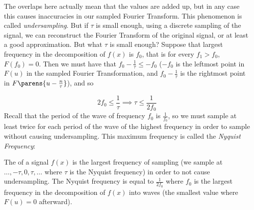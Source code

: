 \documentclass[10pt]{article}
\begin{document}
{\centering{}\par}

The overlaps here actually mean that the values are added up, but in any case this causes inaccuracies in our sampled Fourier Transform.
This phenomenon is called \emph{undersampling}.
But if $\tau$ is small enough, using a discrete sampling of the signal, we can reconstruct the Fourier Transform of the original signal, or at least a good approximation.
But what $\tau$ is small enough?
Suppose that largest frequency in the decomposition of $f(x)$ is $f_0$, that is for every $f_1>f_0$, $F(f_0)=0$.
Then we must have that $f_0-\frac1\tau\leq -f_0$ ($-f_0$ is the leftmost point in $F(u)$ in the sampled Fourier Transformation, and $f_0-\frac1\tau$ is the rightmost point in $F\parens{u-\frac n\tau}$),
and so

\[ 2f_0\leq\frac1\tau \implies \tau\leq\frac1{2f_0} \]
Recall that the period of the wave of frequency $f_0$ is $\frac1{f_0}$, so we must sample at least twice for each period of the wave of the highest frequency in order to sample without causing undersampling.
This maximum frequency is called the \emph{Nyquist Frequency}:

\begin{defn*}

    The  of a signal $f(x)$ is the largest frequency of sampling (we sample at $\dots,-\tau,0,\tau,\dots$ where $\tau$ is the Nyquist frequency) in order to not cause undersampling.
    The Nyquist frequency is equal to $\frac1{2f_0}$ where $f_0$ is the largest frequency in the decomposition of $f(x)$ into waves (the smallest value where $F(u)=0$ afterward).

\end{defn*}
\end{document}
